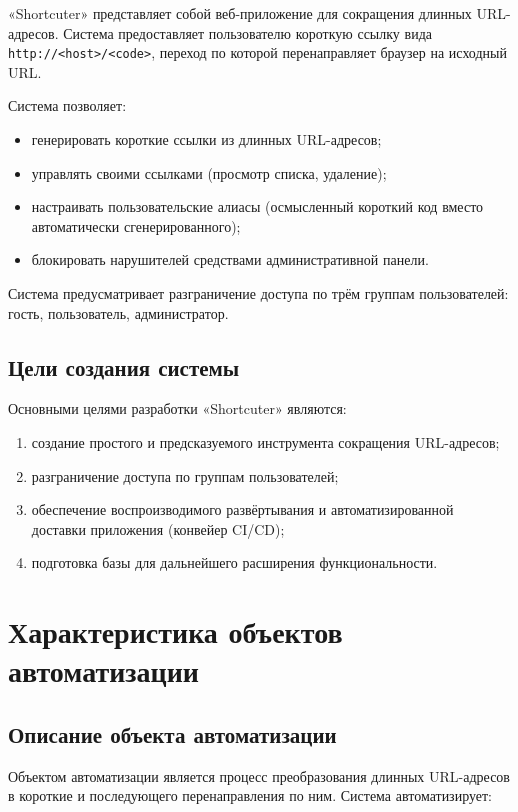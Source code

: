 \documentclass[14pt, a4paper]{extarticle}
\newcommand{\systemname}{«Shortcuter»}
\begin{document}
\systemname{} представляет собой веб-приложение для сокращения длинных URL-адресов. Система предоставляет пользователю короткую ссылку вида \texttt{http://<host>/<code>}, переход по которой перенаправляет браузер на исходный URL.

Система позволяет:

\begin{itemize}
	\item генерировать короткие ссылки из длинных URL-адресов;
	\item управлять своими ссылками (просмотр списка, удаление);
	\item настраивать пользовательские алиасы (осмысленный короткий код вместо автоматически сгенерированного);
	\item блокировать нарушителей средствами административной панели.
\end{itemize}

Система предусматривает разграничение доступа по трём группам пользователей: гость, пользователь, администратор.

\subsection{Цели создания системы}

Основными целями разработки \systemname{} являются:

\begin{enumerate}
	\item создание простого и предсказуемого инструмента сокращения URL-адресов;
	\item разграничение доступа по группам пользователей;
	\item обеспечение воспроизводимого развёртывания и автоматизированной доставки приложения (конвейер CI/CD);
	\item подготовка базы для дальнейшего расширения функциональности.
\end{enumerate}

\section{Характеристика объектов автоматизации}

\subsection{Описание объекта автоматизации}

Объектом автоматизации является процесс преобразования длинных URL-адресов в короткие и последующего перенаправления по ним. Система автоматизирует:
\end{document}
